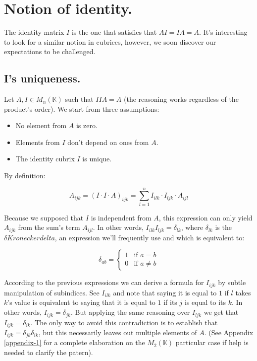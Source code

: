 \section{Notion of identity.} \label{identity}

The identity matrix $I$ is the one that satisfies that $AI = IA = A$. It's interesting to look for a similar notion in cubrices, however, we soon discover our expectations to be challenged.

\subsection{I's uniqueness.} \label{identity-unique}

Let $A, I \in M_{n} (\mathbb{K})$ such that $IIA = A$ (the reasoning works regardless of the product's order). We start from three assumptions:

\begin{itemize}
	\item No element from $A$ is zero.
	\item Elements from $I$ don't depend on ones from $A$.
	\item The identity cubrix $I$ is unique.
\end{itemize}

By definition:

$$A_{ijk} = (I \cdot I \cdot A)_{ijk} = \sum\limits_{l=1}^{n} I_{ilk} \cdot I_{ljk} \cdot A_{ijl}$$

Because we supposed that $I$ is independent from $A$, this expression can only yield $A_{ijk}$ from the sum's term $A_{ijl}$. In other words, $I_{ilk} I_{ljk} = \delta_{lk}$, where $\delta_{lk}$ is the $\delta{Kronecker delta}$, an expression we'll frequently use and which is equivalent to:

\begin{equation}
	\delta_{ab} =
	\begin{cases}
		1 & \text{if } a = b \\
		0 & \text{if } a \neq b
	\end{cases}
\end{equation}

According to the previous expressions we can derive a formula for $I_{ijk}$ by subtle manipulation of subindices. See $I_{ilk}$ and note that saying it is equal to $1$ if $l$ takes $k$'s value is equivalent to saying that it is equal to $1$ if its $j$ is equal to its $k$. In other words, $I_{ijk} = \delta_{jk}$. But applying the same reasoning over $I_{ljk}$ we get that $I_{ijk} = \delta_{ik}$. The only way to avoid this contradiction is to establish that $I_{ijk} = \delta_{jk} \delta_{ik}$, but this necessarily leaves out multiple elements of $A$. (See Appendix \ref{appendix-1} for a complete elaboration on the $M_2 (\mathbb{K})$ particular case if help is needed to clarify the patern).

